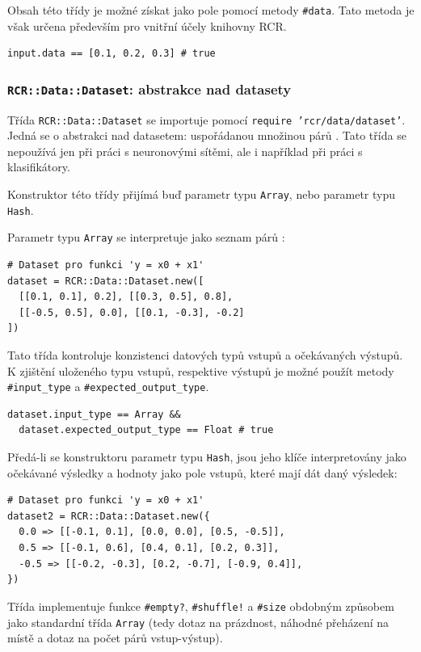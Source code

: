 \documentclass[a4paper]{article}
\begin{document}
Obsah této třídy je možné získat jako pole pomocí metody \texttt{\#data}.
Tato metoda je však určena především pro vnitřní účely knihovny RCR.
\begin{lstlisting}
input.data == [0.1, 0.2, 0.3] # true
\end{lstlisting}

\subsubsection{\texttt{RCR::Data::Dataset}: abstrakce nad datasety}
Třída \texttt{RCR::Data::Dataset} se importuje pomocí \texttt{require
'rcr/data/dataset'}. Jedná se o abstrakci nad datasetem: uspořádanou
množinou párů . Tato třída se nepoužívá jen
při práci s neuronovými sítěmi, ale i například při práci s klasifikátory.

Konstruktor této třídy přijímá buď parametr typu \texttt{Array}, nebo parametr
typu \texttt{Hash}.

Parametr typu \texttt{Array} se interpretuje jako seznam
párů :
\begin{lstlisting}
# Dataset pro funkci 'y = x0 + x1'
dataset = RCR::Data::Dataset.new([
  [[0.1, 0.1], 0.2], [[0.3, 0.5], 0.8],
  [[-0.5, 0.5], 0.0], [[0.1, -0.3], -0.2]
])
\end{lstlisting}

Tato třída kontroluje konzistenci datových typů vstupů a očekávaných výstupů.
K zjištění uloženého typu vstupů, respektive výstupů je možné použít metody
\texttt{\#input\_type} a \texttt{\#expected\_output\_type}.
\begin{lstlisting}
dataset.input_type == Array &&
  dataset.expected_output_type == Float # true
\end{lstlisting}

Předá-li se konstruktoru parametr typu \texttt{Hash}, jsou jeho
klíče interpretovány jako očekávané výsledky a hodnoty jako
pole vstupů, které mají dát daný výsledek:
\begin{lstlisting}
# Dataset pro funkci 'y = x0 + x1'
dataset2 = RCR::Data::Dataset.new({
  0.0 => [[-0.1, 0.1], [0.0, 0.0], [0.5, -0.5]],
  0.5 => [[-0.1, 0.6], [0.4, 0.1], [0.2, 0.3]],
  -0.5 => [[-0.2, -0.3], [0.2, -0.7], [-0.9, 0.4]],
})
\end{lstlisting}

Třída implementuje funkce \texttt{\#empty?}, \texttt{\#shuffle!} a
\texttt{\#size} obdobným způsobem jako standardní třída \texttt{Array}
(tedy dotaz na prázdnost, náhodné přeházení na místě a dotaz na počet párů
vstup-výstup).
\end{document}
